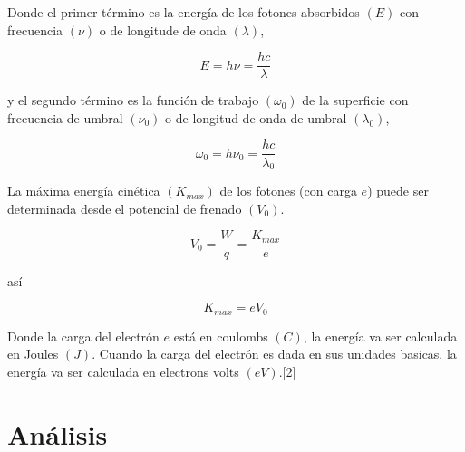 \documentclass{article}
\begin{document}
Donde el primer término es la energía de los fotones absorbidos $(E)$ con frecuencia $(\nu)$ o de longitude de onda $(\lambda)$,

\begin{equation}
    E=h\nu=\frac{hc}{\lambda}
\end{equation}

y el segundo término es la función de trabajo $(\omega_{0})$ de la superficie con frecuencia de umbral $(\nu_{0})$ o de longitud de onda de umbral $(\lambda_{0})$,

\begin{equation}
    \omega_{0}=h\nu_{0}=\frac{hc}{\lambda_{0}}
\end{equation}

La máxima  energía cinética $(K_{max})$ de los fotones (con carga $e$) puede ser determinada desde el potencial de frenado $(V_{0})$.

\begin{equation}
    V_{0}=\frac{W}{q}=\frac{K_{max}}{e}
\end{equation}

así

\begin{equation}
    K_{max}=eV_{0}
\end{equation}

Donde la carga del electrón $e$ está en coulombs $(C)$, la energía va ser calculada en Joules $(J)$. Cuando la carga del electrón es dada en sus unidades basicas, la energía va ser calculada en electrons volts $(eV)$.[2]

\section{Análisis}
\end{document}
